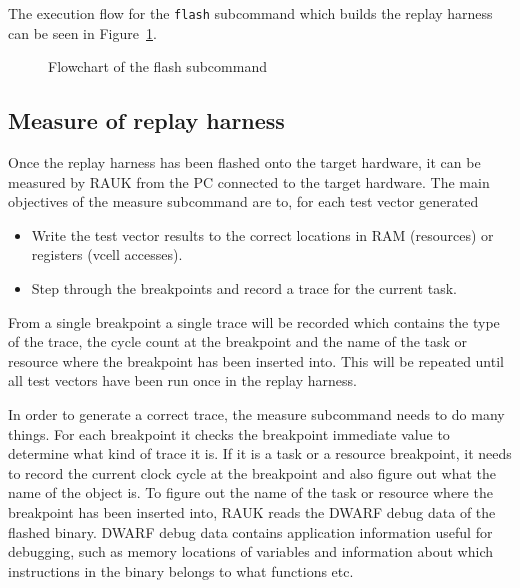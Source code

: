 The execution flow for the \texttt{flash} subcommand which builds the replay
harness can be seen in Figure~\ref{fig:flashcmd}.
\begin{figure}[H]
    \centering
    \caption{Flowchart of the flash subcommand}
    \label{fig:flashcmd}
\end{figure}

\subsection{Measure of replay harness}
Once the replay harness has been flashed onto the target hardware, it can
be measured by RAUK from the PC connected to the target hardware. The main
objectives of the measure subcommand are to, for each test vector generated
\begin{itemize}
    \item Write the test vector results to the correct locations in RAM (resources) or registers (vcell accesses).
   \item Step through the breakpoints and record a trace for the current task.
\end{itemize}
From a single breakpoint a single trace will be recorded which contains the
type of the trace, the cycle count at the breakpoint and the name of the task
or resource where the breakpoint has been inserted into. This will be repeated
until all test vectors have been run once in the replay harness.

In order to generate a correct trace, the measure subcommand needs to do many
things. For each breakpoint it checks the breakpoint immediate value to
determine what kind of trace it is. If it is a task or a resource breakpoint, it
needs to record the current clock cycle at the breakpoint and also figure out
what the name of the object is. To figure out the name of the task or resource
where the breakpoint has been inserted into, RAUK reads the
DWARF\cite{dwarfspec} debug data of the flashed binary. DWARF debug data
contains application information useful for debugging, such as memory
locations of variables and information about which instructions in the binary
belongs to what functions etc.

